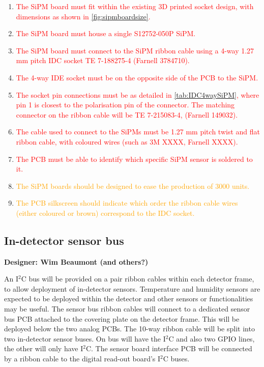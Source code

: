\documentclass[a4paper]{article}
\newcommand{\must}[1]{\textcolor{red}{#1}}
\newcommand{\should}[1]{\textcolor{orange}{#1}}
\def\I2C{I$^2$C}
\begin{document}
\begin{enumerate}
    \item \must{The SiPM board must fit within the existing 3D printed socket design, with dimensions as shown in \cref{fig:sipmboardsize}.}
    \item \must{The SiPM board must house a single S12752-050P SiPM.}
    \item \must{The SiPM board must connect to the SiPM ribbon cable using a 4-way 1.27 mm pitch IDC socket TE 7-188275-4 (Farnell 3784710).}
    \item \must{The 4-way IDE socket must be on the opposite side of the PCB to the SiPM.}
    \item \must{The socket pin connections must be as detailed in \cref{tab:IDC4waySiPM}, where pin 1 is closest to the polarisation pin of the connector. The matching connector on the ribbon cable will be TE 7-215083-4, (Farnell 149032).}
    \item \must{The cable used to connect to the SiPMs must be 1.27 mm pitch twist and flat ribbon cable, with coloured wires (such as 3M XXXX, Farnell XXXX).}
    \item \must{The PCB must be able to identify which specific SiPM sensor is soldered to it.}
    \item \should{The SiPM boards should be designed to ease the production of 3000 units.}
    \item \should{The PCB silkscreen should indicate which order the ribbon cable wires (either coloured or brown) correspond to the IDC socket.}
\end{enumerate}

\clearpage
\newpage
\subsection{In-detector sensor bus}

{\bf Designer: Wim Beaumont (and others?)}

An \I2C bus will be provided on a pair ribbon cables within each detector frame, to allow deployment of in-detector sensors.
Temperature and humidity sensors are expected to be deployed within the detector and other sensors or functionalities may be useful.
The sensor bus ribbon cables will connect to a dedicated sensor bus PCB attached to the covering plate on the detector frame.
This will be deployed below the two analog PCBs.
The 10-way ribbon cable will be split into two in-detector sensor buses.
On bus will have the \I2C and also two GPIO lines, the other will only have \I2C.
The sensor board interface PCB will be connected by a ribbon cable to the digital read-out board's \I2C buses.
\end{document}
